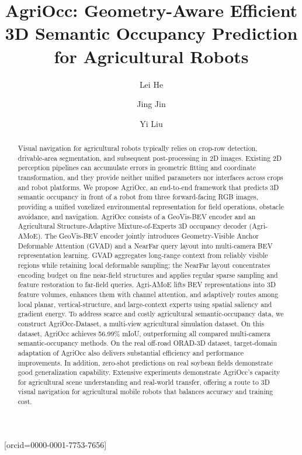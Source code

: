 \documentclass[a4paper,fleqn]{cas-sc}
\begin{document}
\let\WriteBookmarks\relax
\def\floatpagepagefraction{1}
\def\textpagefraction{.001}

\title[mode=title]{AgriOcc: Geometry-Aware Efficient 3D Semantic Occupancy Prediction for Agricultural Robots}
\author[1]{Lei He}
\author[1]{Jing Jin}[orcid=0000-0001-7753-7656]
\cormark[1]
\author[2]{Yi Liu}

\begin{abstract}
Visual navigation for agricultural robots typically relies on crop-row detection, drivable-area segmentation, and subsequent post-processing in 2D images. Existing 2D perception pipelines can accumulate errors in geometric fitting and coordinate transformation, and they provide neither unified parameters nor interfaces across crops and robot platforms. We propose AgriOcc, an end-to-end framework that predicts 3D semantic occupancy in front of a robot from three forward-facing RGB images, providing a unified voxelized environmental representation for field operations, obstacle avoidance, and navigation. AgriOcc consists of a GeoVis-BEV encoder and an Agricultural Structure-Adaptive Mixture-of-Experts 3D occupancy decoder (Agri-AMoE). The GeoVis-BEV encoder jointly introduces Geometry-Visible Anchor Deformable Attention (GVAD) and a NearFar query layout into multi-camera BEV representation learning. GVAD aggregates long-range context from reliably visible regions while retaining local deformable sampling; the NearFar layout concentrates encoding budget on fine near-field structures and applies regular sparse sampling and feature restoration to far-field queries. Agri-AMoE lifts BEV representations into 3D feature volumes, enhances them with channel attention, and adaptively routes among local planar, vertical-structure, and large-context experts using spatial saliency and gradient energy. To address scarce and costly agricultural semantic-occupancy data, we construct AgriOcc-Dataset, a multi-view agricultural simulation dataset. On this dataset, AgriOcc achieves 56.99\% mIoU, outperforming all compared multi-camera semantic-occupancy methods. On the real off-road ORAD-3D dataset, target-domain adaptation of AgriOcc also delivers substantial efficiency and performance improvements. In addition, zero-shot predictions on real soybean fields demonstrate good generalization capability. Extensive experiments demonstrate AgriOcc's capacity for agricultural scene understanding and real-world transfer, offering a route to 3D visual navigation for agricultural mobile robots that balances accuracy and training cost.
\end{abstract}
\end{document}
